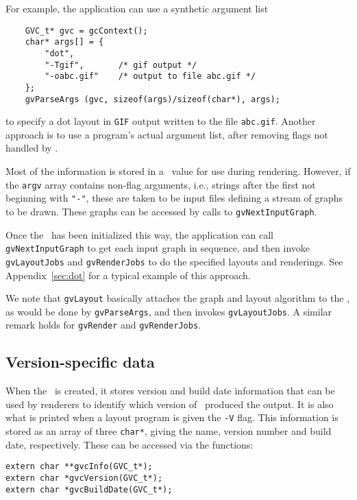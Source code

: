 For example, the application can use a synthetic argument list
\begin{verbatim}
    GVC_t* gvc = gcContext();
    char* args[] = {
        "dot",
        "-Tgif",       /* gif output */
        "-oabc.gif"    /* output to file abc.gif */
    };
    gvParseArgs (gvc, sizeof(args)/sizeof(char*), args);
\end{verbatim}
to specify a dot layout in {\tt GIF} output written to the file {\tt abc.gif}.
Another approach is to use a program's actual argument list, 
after removing flags not handled by \gviz.
 
Most of the information is stored in a \gvc\ value for use during
rendering. However,
if the {\tt argv} array contains non-flag arguments, i.e., strings
after the first not beginning with {\tt "-"}, these are taken
to be input files defining a stream of graphs to be drawn. 
These graphs can be accessed by calls to {\tt gvNextInputGraph}.

Once the \gvc\ has been initialized this way, the application can
call {\tt gvNextInputGraph} to get each input graph in sequence, and
then invoke {\tt gvLayoutJobs} and {\tt gvRenderJobs}
to do the specified layouts and renderings. See
Appendix~\ref{sec:dot} for a typical example of this approach.

We note that {\tt gvLayout} basically attaches the graph
and layout algorithm to the \gvc, as would be done by
{\tt gvParseArgs}, and then invokes {\tt gvLayoutJobs}. A similar
remark holds for {\tt gvRender} and {\tt gvRenderJobs}.
 
\subsection{Version-specific data}
\label{sec:info}

When the \gvc\ is created, it stores version and build date information 
that can be used by renderers to identify which version of \gviz\ produced
the output. It is also what is printed when a layout program is given the {\tt -V}
flag. This information is stored as an array of three {\tt char*}, giving the
name, version number and build date, respectively.  
These can be accessed via the functions:
\begin{verbatim}
extern char **gvcInfo(GVC_t*);
extern char *gvcVersion(GVC_t*);
extern char *gvcBuildDate(GVC_t*);
\end{verbatim}

